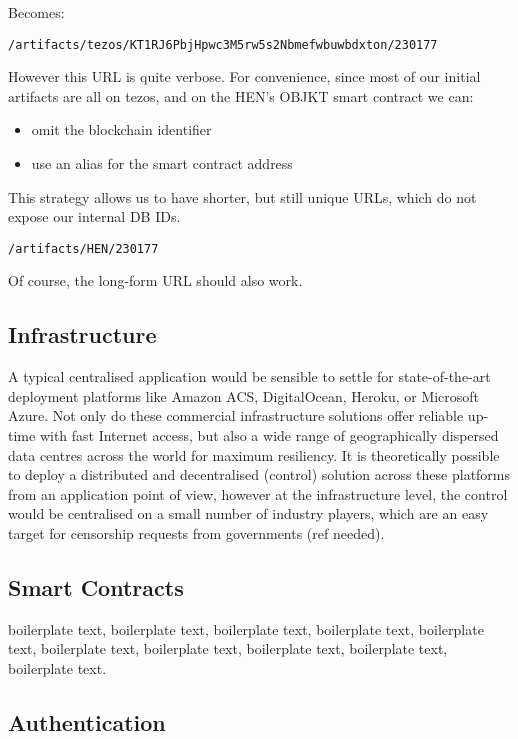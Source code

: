 Becomes:

\texttt{/artifacts/tezos/KT1RJ6PbjHpwc3M5rw5s2Nbmefwbuwbdxton/230177}


However this URL is quite verbose. For convenience, since most of our initial artifacts are all on tezos, and on the HEN's OBJKT smart contract we can:

\begin{itemize}
    \item omit the blockchain identifier
    \item use an alias for the smart contract address
\end{itemize}

This strategy allows us to have shorter, but still unique URLs, which do not expose our internal DB IDs.

\texttt{/artifacts/HEN/230177}

Of course, the long-form URL should also work.

\subsection{Infrastructure}

A typical centralised application would be sensible to settle for state-of-the-art deployment platforms like Amazon ACS, DigitalOcean, Heroku, or Microsoft Azure. Not only do these commercial infrastructure solutions offer reliable up-time with fast Internet access, but also a wide range of geographically dispersed data centres across the world for maximum resiliency. It is theoretically possible to deploy a distributed and decentralised (control) solution across these platforms from an application point of view, however at the infrastructure level, the control would be centralised on a small number of industry players, which are an easy target for censorship requests from governments (ref needed).

\subsection{Smart Contracts}

boilerplate text, boilerplate text, boilerplate text, boilerplate text, boilerplate text, boilerplate text, boilerplate text, boilerplate text, boilerplate text, boilerplate text.

\subsection{Authentication}

